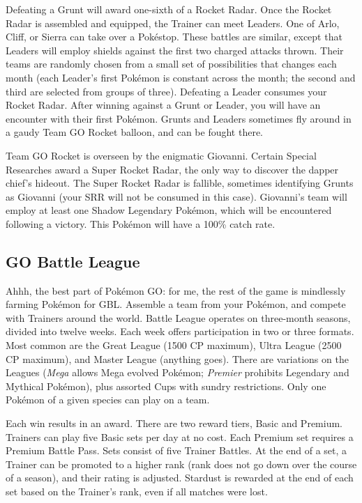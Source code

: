 Defeating a Grunt will award one-sixth of a Rocket Radar.
Once the Rocket Radar is assembled and equipped, the Trainer can meet Leaders.
One of Arlo, Cliff, or Sierra can take over a Pokéstop.
These battles are similar, except that Leaders will employ shields against the first two charged attacks thrown.
Their teams are randomly chosen from a small set of possibilities that changes each month
  (each Leader's first Pokémon is constant across the month; the second and third are selected
  from groups of three).
Defeating a Leader consumes your Rocket Radar.
After winning against a Grunt or Leader, you will have an encounter with their first Pokémon.
Grunts and Leaders sometimes fly around in a gaudy Team GO Rocket balloon,
  and can be fought there.

Team GO Rocket is overseen by the enigmatic Giovanni.
Certain Special Researches award a Super Rocket Radar, the only way to discover
 the dapper chief's hideout.
The Super Rocket Radar is fallible, sometimes identifying Grunts as Giovanni
 (your SRR will not be consumed in this case).
Giovanni's team will employ at least one Shadow Legendary Pokémon, which
 will be encountered following a victory.
This Pokémon will have a 100\% catch rate.

\subsection{GO Battle League}
\label{subsec:league}
Ahhh, the best part of Pokémon GO: for me, the rest of the game is mindlessly farming Pokémon for GBL.
Assemble a team from your Pokémon, and compete with Trainers around the world.
Battle League operates on three-month seasons, divided into twelve weeks.
Each week offers participation in two or three formats.
Most common are the Great League (1500 CP maximum), Ultra League (2500 CP maximum),
 and Master League (anything goes).
There are variations on the Leagues (\textit{Mega} allows Mega evolved Pokémon;
 \textit{Premier} prohibits Legendary and Mythical Pokémon),
 plus assorted Cups with sundry restrictions.
Only one Pokémon of a given species can play on a team.

Each win results in an award.
There are two reward tiers, Basic and Premium.
Trainers can play five Basic sets per day at no cost.
Each Premium set requires a Premium Battle Pass.
Sets consist of five Trainer Battles.
At the end of a set, a Trainer can be promoted to a higher rank (rank does not
 go down over the course of a season), and their rating is adjusted.
Stardust is rewarded at the end of each set based on the Trainer's rank,
 even if all matches were lost.

